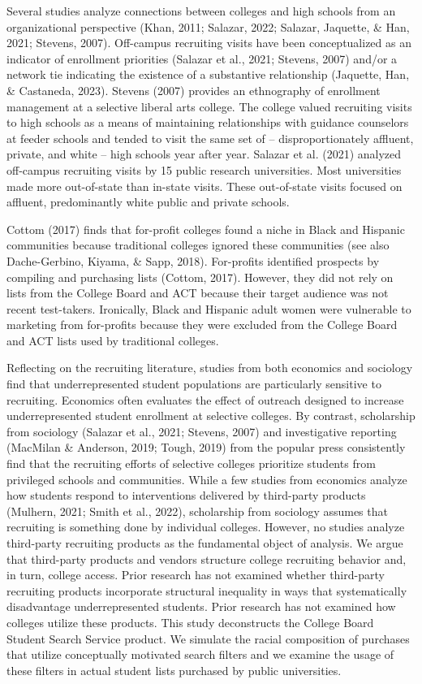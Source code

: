 \documentclass[
  12pt,
]{article}
\begin{document}
Several studies analyze connections between colleges and high schools from an organizational perspective (Khan, 2011; Salazar, 2022; Salazar, Jaquette, \& Han, 2021; Stevens, 2007). Off-campus recruiting visits have been conceptualized as an indicator of enrollment priorities (Salazar et al., 2021; Stevens, 2007) and/or a network tie indicating the existence of a substantive relationship (Jaquette, Han, \& Castaneda, 2023). Stevens (2007) provides an ethnography of enrollment management at a selective liberal arts college. The college valued recruiting visits to high schools as a means of maintaining relationships with guidance counselors at feeder schools and tended to visit the same set of -- disproportionately affluent, private, and white -- high schools year after year. Salazar et al. (2021) analyzed off-campus recruiting visits by 15 public research universities. Most universities made more out-of-state than in-state visits. These out-of-state visits focused on affluent, predominantly white public and private schools.

Cottom (2017) finds that for-profit colleges found a niche in Black and Hispanic communities because traditional colleges ignored these communities (see also Dache-Gerbino, Kiyama, \& Sapp, 2018). For-profits identified prospects by compiling and purchasing lists (Cottom, 2017). However, they did not rely on lists from the College Board and ACT because their target audience was not recent test-takers. Ironically, Black and Hispanic adult women were vulnerable to marketing from for-profits because they were excluded from the College Board and ACT lists used by traditional colleges.

Reflecting on the recruiting literature, studies from both economics and sociology find that underrepresented student populations are particularly sensitive to recruiting.
Economics often evaluates the effect of outreach designed to increase underrepresented student enrollment at selective colleges. By contrast, scholarship from sociology (Salazar et al., 2021; Stevens, 2007) and investigative reporting (MacMilan \& Anderson, 2019; Tough, 2019) from the popular press consistently find that the recruiting efforts of selective colleges prioritize students from privileged schools and communities. While a few studies from economics analyze how students respond to interventions delivered by third-party products (Mulhern, 2021; Smith et al., 2022), scholarship from sociology assumes that recruiting is something done by individual colleges. However, no studies analyze third-party recruiting products as the fundamental object of analysis. We argue that third-party products and vendors structure college recruiting behavior and, in turn, college access. Prior research has not examined whether third-party recruiting products incorporate structural inequality in ways that systematically disadvantage underrepresented students. Prior research has not examined how colleges utilize these products. This study deconstructs the College Board Student Search Service product. We simulate the racial composition of purchases that utilize conceptually motivated search filters and we examine the usage of these filters in actual student lists purchased by public universities.
\end{document}
